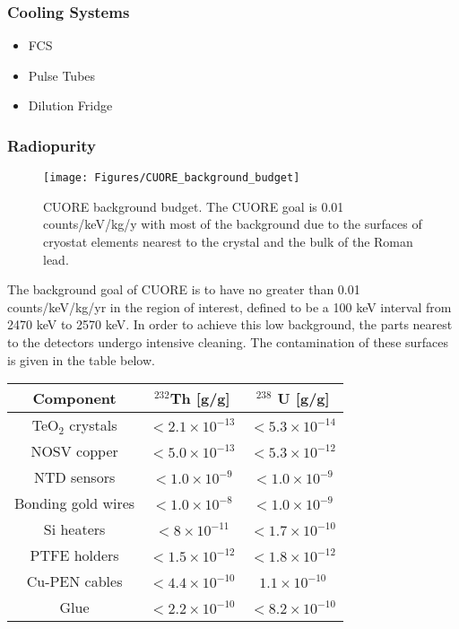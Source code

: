\documentclass[12pt,a4paper]{article}
\begin{document}
\subsubsection{Cooling Systems}
\begin{itemize}
\item FCS
\item Pulse Tubes
\item Dilution Fridge
\end{itemize}

\subsubsection{Radiopurity}

\begin{figure}[h]
\centering
\texttt{[image: Figures/CUORE\_background\_budget]}
\caption{CUORE background budget. The CUORE goal is 0.01 counts/keV/kg/y with most of the background due to the surfaces of cryostat elements nearest to the crystal and the bulk of the Roman lead.}
\label{fig:istogramma}
\end{figure}

The background goal of CUORE is to have no greater than 0.01 counts/keV/kg/yr in the region of interest, defined to be a 100 keV interval from 2470 keV to 2570 keV. In order to achieve this low background, the parts nearest to the detectors undergo intensive cleaning. The contamination of these surfaces is given in the table below.

\begin{tabular}{|c|c|c|}
\hline 
 Component & $^{232}$Th [g/g] & $^{238}$ U [g/g] \\ 
\hline 
TeO$_2$ crystals & $< 2.1\times 10^{-13}$ & $<5.3\times 10^{-14}$ \\ 
\hline 
NOSV copper & $<5.0 \times 10^{-13}$ & $<5.3 \times 10^{-12}$ \\ 
\hline 
NTD sensors & $< 1.0 \times 10^{-9}$ & $<1.0 \times 10^{-9}$ \\ 
\hline 
Bonding gold wires & $< 1.0 \times 10^{-8}$ & $<1.0 \times 10^{-9}$ \\ 
\hline 
Si heaters &   $<8\times 10^{-11}$ & $<1.7 \times 10^{-10}$ \\ 
\hline 
PTFE holders & $<1.5\times 10^{-12}$ & $<1.8 \times 10^{-12}$ \\ 
\hline 
Cu-PEN cables & $<4.4\times 10^{-10}$ & $1.1 \times 10^{-10}$ \\ 
\hline
Glue & $<2.2\times 10^{-10}$ & $<8.2\times10^{-10}$ \\
\hline 
\end{tabular} 
\end{document}
